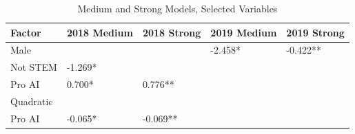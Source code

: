 \documentclass[AER]{./aea-latex-templates/AEA}
\begin{document}
        \begin{table}
            \caption{Medium and Strong Models, Selected Variables}
            \begin{tabular}{lllll}
            Factor & 2018 Medium & 2018 Strong & 2019 Medium & 2019 Strong \\
            \toprule
            Male &  &  & -2.458* & -0.422** \\
            Not STEM & -1.269* \\ %
            Pro AI & 0.700* & 0.776** \\ %
            Quadratic
            \\Pro AI & -0.065* & -0.069** \\ %

\end{tabular}
\end{table}
\end{document}
